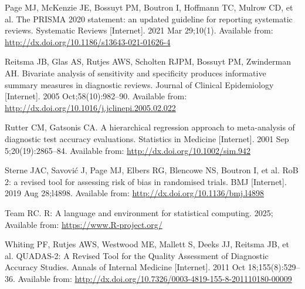 \documentclass[
  11pt,
  a4paper,
  DIV=11,
  numbers=noendperiod]{scrreprt}
\newlength{\cslhangindent}
\newenvironment{CSLReferences}[2] %
 {\begin{list}{}{%
  \setlength{\itemindent}{0pt}
  \setlength{\leftmargin}{0pt}
  \setlength{\parsep}{0pt}
  \ifodd #1
   \setlength{\leftmargin}{\cslhangindent}
   \setlength{\itemindent}{-1\cslhangindent}
  \fi
  \setlength{\itemsep}{#2\baselineskip}}}
 {\end{list}}
\begin{document}
\begin{CSLReferences}{1}{1}
Page MJ, McKenzie JE, Bossuyt PM, Boutron I, Hoffmann TC, Mulrow CD, et
al. The PRISMA 2020 statement: an updated guideline for reporting
systematic reviews. Systematic Reviews {[}Internet{]}. 2021 Mar
29;10(1). Available from:
\url{http://dx.doi.org/10.1186/s13643-021-01626-4}

Reitsma JB, Glas AS, Rutjes AWS, Scholten RJPM, Bossuyt PM, Zwinderman
AH. Bivariate analysis of sensitivity and specificity produces
informative summary measures in diagnostic reviews. Journal of Clinical
Epidemiology {[}Internet{]}. 2005 Oct;58(10):982--90. Available from:
\url{http://dx.doi.org/10.1016/j.jclinepi.2005.02.022}

Rutter CM, Gatsonis CA. A hierarchical regression approach to
meta{-}analysis of diagnostic test accuracy evaluations. Statistics in
Medicine {[}Internet{]}. 2001 Sep 5;20(19):2865--84. Available from:
\url{http://dx.doi.org/10.1002/sim.942}

Sterne JAC, Savović J, Page MJ, Elbers RG, Blencowe NS, Boutron I, et
al. RoB 2: a revised tool for assessing risk of bias in randomised
trials. BMJ {[}Internet{]}. 2019 Aug 28;l4898. Available from:
\url{http://dx.doi.org/10.1136/bmj.l4898}

Team RC. R: A language and environment for statistical computing. 2025;
Available from: \url{https://www.R-project.org/}

Whiting PF, Rutjes AWS, Westwood ME, Mallett S, Deeks JJ, Reitsma JB, et
al. QUADAS-2: A Revised Tool for the Quality Assessment of Diagnostic
Accuracy Studies. Annals of Internal Medicine {[}Internet{]}. 2011 Oct
18;155(8):529--36. Available from:
\url{http://dx.doi.org/10.7326/0003-4819-155-8-201110180-00009}

\end{CSLReferences}
\end{document}
